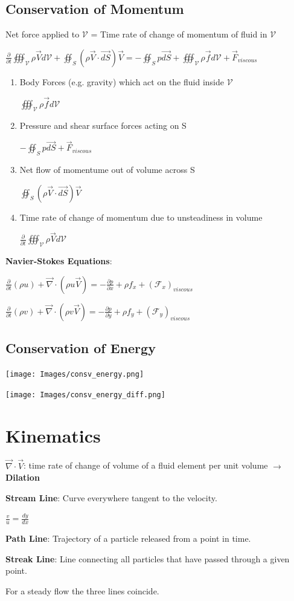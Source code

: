 \documentclass{article}
\begin{document}
\begin{multicols*}{3}
\subsection*{Conservation of Momentum}
Net force applied to $\mathcal{V}$ = Time rate of change of momentum of fluid in $\mathcal{V}$\par 
$\frac{\partial}{\partial t}\oiiint_\mathcal{V}\rho\vec{V}d\mathcal{V}+\oiint_S(\rho\vec{V}\cdot\vec{dS})\vec{V}=-\oiint_S p\vec{dS}+\oiiint_\mathcal{V}\rho\vec{f}d\mathcal{V}+\vec{F}_{viscous}$
\begin{enumerate}
    \item Body Forces (e.g. gravity) which act on the fluid inside $\mathcal{V}$\par
    $\oiiint_\mathcal{V}\rho\vec{f}d\mathcal{V}$
    \item Pressure and shear surface forces acting on S\par 
    $-\oiint_S p\vec{dS}+\vec{F}_{viscous}$
    \item Net flow of momentume out of volume across S\par 
    $\oiint_S(\rho\vec{V}\cdot\vec{dS})\vec{V}$
    \item Time rate of change of momentum due to unsteadiness in volume\par 
    $\frac{\partial}{\partial t}\oiiint_\mathcal{V}\rho\vec{V}d\mathcal{V}$
\end{enumerate}
\textbf{Navier-Stokes Equations}:\par
$\frac{\partial}{\partial t}(\rho u)+\vec{\nabla}\cdot(\rho u \vec{V}) = -\frac{\partial p}{\partial x}+\rho f_x+(\mathcal{F}_x)_{viscous}$\par
$\frac{\partial}{\partial t}(\rho v)+\vec{\nabla}\cdot(\rho v \vec{V}) = -\frac{\partial p}{\partial y}+\rho f_y+(\mathcal{F}_y)_{viscous}$\par

\subsection*{Conservation of Energy}
\texttt{[image: Images/consv\_energy.png]}\par
\texttt{[image: Images/consv\_energy\_diff.png]}

\section*{Kinematics}
$\vec{\nabla}\cdot\vec{V}$: time rate of change of volume of a fluid element per unit volume $\rightarrow$ \textbf{Dilation}\par
\textbf{Stream Line}: Curve everywhere tangent to the velocity.\par
$\frac{v}{u}=\frac{dy}{dx}$\par 
\textbf{Path Line}: Trajectory of a particle released from a point in time.\par 
\textbf{Streak Line}: Line connecting all particles that have passed through a given point.\par 
For a steady flow the three lines coincide.\par

\end{multicols*}
\end{document}
